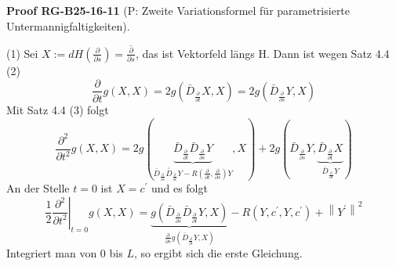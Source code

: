 \documentclass[10pt, letterpaper]{article}
\newcommand{\CustomHeading}[3]{%
  \par\medskip\noindent%
  \textbf{#1 #2} \textnormal{(#3)}.\enskip%
}
\newenvironment{PROOF}[2]{\begin{unitbox}\CustomHeading{Proof}{#1}{#2}}{\end{unitbox}}
\begin{document}
\begin{PROOF}{RG-B25-16-11}{P: Zweite Variationsformel für parametrisierte Untermannigfaltigkeiten}
(1) Sei $X:=d H\left(\frac{\partial}{\partial s}\right)=\overline{\frac{\partial}{\partial s}}$, das ist Vektorfeld längs H. Dann ist wegen Satz 4.4 (2)
$$
\frac{\partial}{\partial t} g(X, X)=2 g\left(\bar{D}_{\frac{\partial}{\partial t}} X, X\right)=2 g\left(\bar{D}_{\frac{\partial}{\partial s}} Y, X\right)
$$
Mit Satz 4.4 (3) folgt
$$
\frac{\partial^{2}}{\partial t^{2}} g(X, X)=2 g(\underbrace{\bar{D}_{\frac{\partial}{\partial t}} \bar{D}_{\frac{\partial}{\partial s}} Y}_{\bar{D}_{\frac{\partial}{\partial s}} \overline{\bar{D}}_{\frac{\partial}{\partial t}} Y-R\left(\frac{\partial}{\partial t}, \frac{\partial}{\partial s}\right) Y}, X)+2 g(\bar{D}_{\frac{\partial}{\partial s}} Y, \underbrace{\bar{D}_{\frac{\partial}{\partial t}} X}_{\bar{D}_{\frac{\partial}{\partial s}} Y})
$$
An der Stelle $t=0$ ist $X=c^{\prime}$ und es folgt
$$
\left.\frac{1}{2} \frac{\partial^{2}}{\partial t^{2}}\right|_{t=0} g(X, X)=\underbrace{g\left(\bar{D}_{\frac{\partial}{\partial s}} \bar{D}_{\frac{\partial}{\partial t}} Y, X\right)}_{\frac{\partial}{\partial s} g\left(\bar{D}_{\frac{\partial}{\partial t}} Y, X\right)}-R\left(Y, c^{\prime}, Y, c^{\prime}\right)+\left\|Y^{\prime}\right\|^{2}
$$
Integriert man von 0 bis $L$, so ergibt sich die erste Gleichung.


\end{PROOF}
\end{document}
